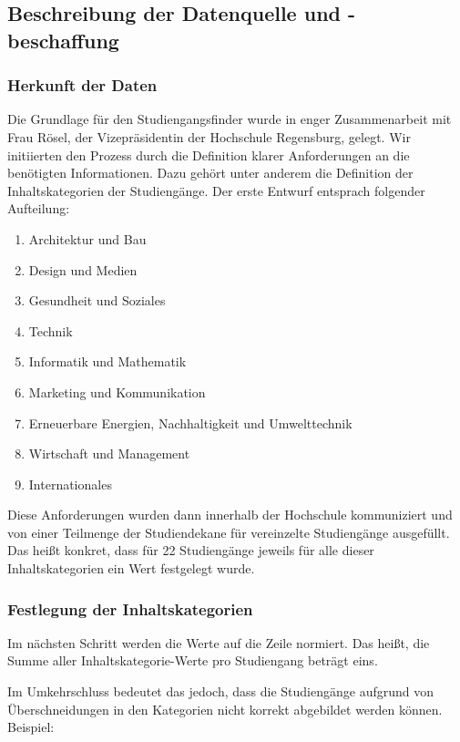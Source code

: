 \subsection{Beschreibung der Datenquelle und -beschaffung}
\subsubsection{Herkunft der Daten}
Die Grundlage für den Studiengangsfinder wurde in enger Zusammenarbeit mit Frau
Rösel, der Vizepräsidentin der Hochschule Regensburg, gelegt. Wir initiierten
den Prozess durch die Definition klarer Anforderungen an die benötigten
Informationen. Dazu gehört unter anderem die Definition der Inhaltskategorien
der Studiengänge. Der erste Entwurf entsprach folgender Aufteilung:

\begin{enumerate}
    \item Architektur und Bau
    \item Design und Medien
    \item Gesundheit und Soziales
    \item Technik
    \item Informatik und Mathematik
    \item Marketing und Kommunikation
    \item Erneuerbare Energien, Nachhaltigkeit und Umwelttechnik
    \item Wirtschaft und Management
    \item Internationales
\end{enumerate}

Diese Anforderungen wurden dann innerhalb der Hochschule kommuniziert und von
einer Teilmenge der Studiendekane für vereinzelte Studiengänge ausgefüllt. Das
heißt konkret, dass für 22 Studiengänge jeweils für alle dieser
Inhaltskategorien ein Wert festgelegt wurde.

\subsubsection{Festlegung der Inhaltskategorien}
Im nächsten Schritt werden die Werte auf die Zeile normiert. Das heißt, die
Summe aller Inhaltskategorie-Werte pro Studiengang beträgt eins.

Im Umkehrschluss bedeutet das jedoch, dass die Studiengänge aufgrund von
Überschneidungen in den Kategorien nicht korrekt abgebildet werden können.
Beispiel:


